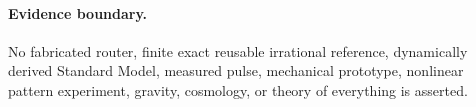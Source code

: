 \paragraph{Evidence boundary.}
No fabricated router, finite exact reusable irrational reference, dynamically derived Standard Model, measured pulse, mechanical prototype, nonlinear pattern experiment, gravity, cosmology, or theory of everything is asserted.
